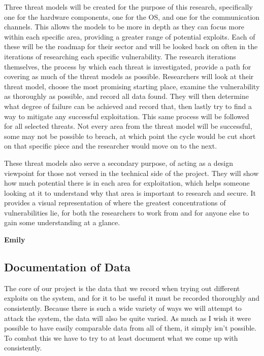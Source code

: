 \documentclass[IEEEtran,letterpaper,10pt,notitlepage,draftclsnofoot,onecolumn]{article}
\begin{document}
Three threat models will be created for the purpose of this research, specifically one for the hardware components, one for the OS, and one for the communication channels.
This allows the models to be more in depth as they can focus more within each specific area, providing a greater range of potential exploits.
Each of these will be the roadmap for their sector and will be looked back on often in the iterations of researching each specific vulnerability.
The research iterations themselves, the process by which each threat is investigated, provide a path for covering as much of the threat models as possible.
Researchers will look at their threat model, choose the most promising starting place, examine the vulnerability as thoroughly as possible, and record all data found.
They will then determine what degree of failure can be achieved and record that, then lastly try to find a way to mitigate any successful exploitation.
This same process will be followed for all selected threats.
Not every area from the threat model will be successful, some may not be possible to breach, at which point the cycle would be cut short on that specific piece and the researcher would move on to the next.

These threat models also serve a secondary purpose, of acting as a design viewpoint for those not versed in the technical side of the project.
They will show how much potential there is in each area for exploitation, which helps someone looking at it to understand why that area is important to research and secure.
It provides a visual representation of where the greatest concentrations of vulnerabilities lie, for both the researchers to work from and for anyone else to gain some understanding at a glance.

\textbf{Emily}

\subsection{Documentation of Data}
The core of our project is the data that we record when trying out different exploits on the system, and for it to be useful it must be recorded thoroughly and consistently.
Because there is such a wide variety of ways we will attempt to attack the system, the data will also be quite varied.
As much as I wish it were possible to have easily comparable data from all of them, it simply isn't possible.
To combat this we have to try to at least document what we come up with consistently.
\end{document}
